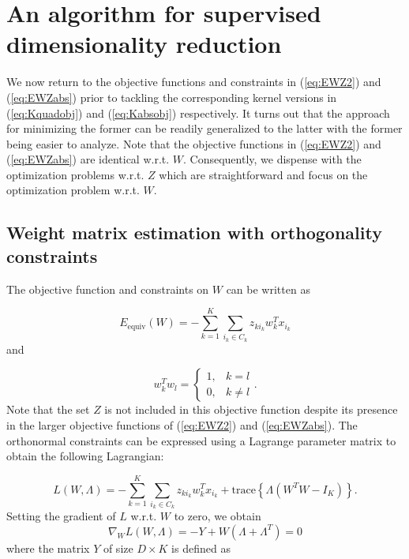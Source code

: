 
\section{An algorithm for supervised dimensionality reduction}

We now return to the objective functions and constraints in (\ref{eq:EWZ2})
and (\ref{eq:EWZabs}) prior to tackling the corresponding kernel
versions in (\ref{eq:Kquadobj}) and (\ref{eq:Kabsobj}) respectively.
It turns out that the approach for minimizing the former can be readily
generalized to the latter with the former being easier to analyze.
Note that the objective functions in (\ref{eq:EWZ2}) and (\ref{eq:EWZabs})
are identical w.r.t. $W$. Consequently, we dispense with the optimization
problems w.r.t. $Z$ which are straightforward and focus on the optimization
problem w.r.t. $W$. 

\subsection{Weight matrix estimation with orthogonality constraints}

The objective function and constraints on $W$ can be written as 

\begin{equation}
E_{\mathrm{equiv}}(W)=-\sum_{k=1}^{K}\sum_{i_{k}\in C_{k}}z_{ki_{k}}w_{k}^{T}x_{i_{k}}\label{eq:Eequiv}
\end{equation}
and

\begin{equation}
w_{k}^{T}w_{l}=\left\{ \begin{array}{cc}
1, & k=l\\
0, & k\neq l
\end{array}.\right.\label{eq:wkwlconstraintsfinal}
\end{equation}
Note that the set $Z$ is not included in this objective function
despite its presence in the larger objective functions of (\ref{eq:EWZ2})
and (\ref{eq:EWZabs}). The orthonormal constraints can be expressed
using a Lagrange parameter matrix to obtain the following Lagrangian:

\begin{equation}
L(W,\Lambda)=-\sum_{k=1}^{K}\sum_{i_{k}\in C_{k}}z_{ki_{k}}w_{k}^{T}x_{i_{k}}+\mbox{trace}\left\{ \Lambda\left(W^{T}W-I_{K}\right)\right\} .\label{eq:Lagrangianortho}
\end{equation}
Setting the gradient of $L$ w.r.t. $W$ to zero, we obtain
\begin{equation}
\nabla_{W}L\left(W,\Lambda\right)=-Y+W\left(\Lambda+\Lambda^{T}\right)=0\label{eq:gradLagrangian}
\end{equation}
where the matrix $Y$ of size $D\times K$ is defined as 

